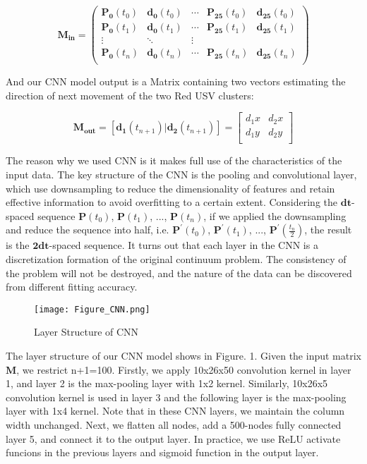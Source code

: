 \documentclass{mcmthesis}
\begin{document}
\begin{equation}
\mathbf{M_{in}} = 
  \begin{pmatrix}
  \mathbf{P_{0}}(t_0) & \mathbf{d_{0}}(t_0) & \cdots & \mathbf{P_{25}}(t_0) & \mathbf{d_{25}}(t_0)\\
  \mathbf{P_{0}}(t_1) & \mathbf{d_{0}}(t_1) & \cdots & \mathbf{P_{25}}(t_1) & \mathbf{d_{25}}(t_1) \\
  \vdots & \ddots & \vdots \\  
  \mathbf{P_{0}}(t_n) & \mathbf{d_{0}}(t_n) & \cdots & \mathbf{P_{25}}(t_n) & \mathbf{d_{25}}(t_n)  \\
  \end{pmatrix}
\end{equation}

And our CNN model output is a Matrix containing two vectors estimating the direction of next movement of the two Red USV clusters:

\begin{equation}
\mathbf{M_{out}} = [\mathbf{d_{1}}(t_{n+1}) \vert \mathbf{d_{2}}(t_{n+1})] = 
  \begin{bmatrix}
  d_1x & d_2x\\
  d_1y & d_2y  \\
  \end{bmatrix}
\end{equation}

The reason why we used CNN is it makes full use of the characteristics of the input data. The key structure of the CNN is the pooling and convolutional layer, which use downsampling to reduce the dimensionality of features and retain effective information to avoid overfitting to a certain extent. Considering the $\mathbf{dt}$-spaced sequence $\mathbf{P}(t_0)$, $\mathbf{P}(t_1)$, ..., $\mathbf{P}(t_n)$, if we applied the downsampling and reduce the sequence into half, i.e. $\mathbf{P}^{'}(t_0)$, $\mathbf{P}^{'}(t_1)$, ..., $\mathbf{P}^{'}(\frac{t_n}{2})$, the result is the $\mathbf{2dt}$-spaced sequence. It turns out that each layer in the CNN is a discretization formation of the original continuum problem. The consistency of the problem will not be destroyed, and the nature of the data can be discovered from different fitting accuracy.

\begin{figure}[h]
\small
\centering
\texttt{[image: Figure\_CNN.png]}
\caption{Layer Structure of CNN} \label{fig:Layer Structure of CNN}
\end{figure}

The layer structure of our CNN model shows in Figure. 1. Given the input matrix $\mathbf{M}$, we restrict n+1=100. Firstly, we apply 10x26x50 convolution kernel in layer 1, and layer 2 is the max-pooling layer with 1x2 kernel. Similarly, 10x26x5 convolution kernel is used in layer 3 and the following layer is the max-pooling layer with 1x4 kernel. Note that in these CNN layers, we maintain the column width unchanged. Next, we flatten all nodes, add a 500-nodes fully connected layer 5, and connect it to the output layer. In practice, we use ReLU activate funcions in the previous layers and sigmoid function in the output layer. \par
\end{document}
